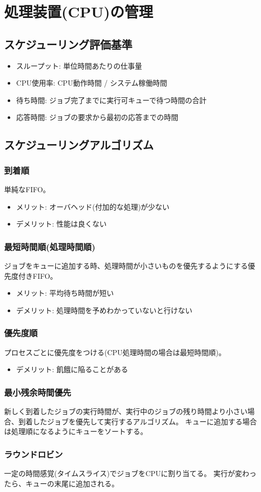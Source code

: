 \section{処理装置(CPU)の管理}
\subsection*{スケジューリング評価基準}
\begin{itemize}
    \item スループット: 単位時間あたりの仕事量
    \item CPU使用率: CPU動作時間 / システム稼働時間
    \item 待ち時間: ジョブ完了までに実行可キューで待つ時間の合計
    \item 応答時間: ジョブの要求から最初の応答までの時間
\end{itemize}

\subsection*{スケジューリングアルゴリズム}
\subsubsection*{到着順}
単純なFIFO。
\begin{itemize}
    \item メリット: オーバヘッド(付加的な処理)が少ない
    \item デメリット: 性能は良くない
\end{itemize}

\subsubsection*{最短時間順(処理時間順)}
ジョブをキューに追加する時、処理時間が小さいものを優先するようにする優先度付きFIFO。
\begin{itemize}
    \item メリット: 平均待ち時間が短い
    \item デメリット: 処理時間を予めわかっていないと行けない
\end{itemize}

\subsubsection*{優先度順}
プロセスごとに優先度をつける(CPU処理時間の場合は最短時間順)。

\begin{itemize}
    \item デメリット: 飢餓に陥ることがある
\end{itemize}

\subsubsection*{最小残余時間優先}
新しく到着したジョブの実行時間が、実行中のジョブの残り時間より小さい場合、到着したジョブを優先して実行するアルゴリズム。
キューに追加する場合は処理順になるようにキューをソートする。

\subsubsection*{ラウンドロビン}
一定の時間感覚(タイムスライス)でジョブをCPUに割り当てる。
実行が変わったら、キューの末尾に追加される。